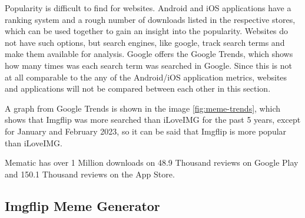 Popularity is difficult to find for websites. Android and iOS applications have a ranking system and a rough number of downloads listed in the respective stores, which can be used together to gain an insight into the popularity. Websites do not have such options, but search engines, like google, track search terms and make them available for analysis. Google offers the Google Trends, which shows how many times was each search term was searched in Google. Since this is not at all comparable to the any of the Android/iOS application metrics, websites and applications will not be compared between each other in this section.

A graph from Google Trends is shown in the image \ref{fig:meme-trends}, which shows that Imgflip was more searched than iLoveIMG for the past 5 years, except for January and February 2023, so it can be said that Imgflip is more popular than iLoveIMG.

Mematic has over 1 Million downloads on 48.9 Thousand reviews on Google Play\cite{mematic-google} and 150.1 Thousand reviews on the App Store\cite{mematic-apple}.

\subsection{Imgflip Meme Generator}

